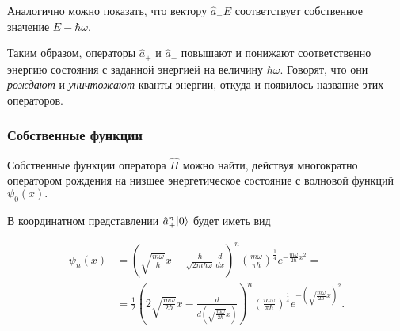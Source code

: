 \documentclass[b5paper]{book}
\DeclarePairedDelimiter\ket{\lvert}{\rangle}
\begin{document}
Аналогично можно показать, что вектору $\hat a_{-} E$ соответствует собственное значение $E - \hbar \omega.$

Таким образом, операторы $\hat a_{+}$ и $\hat a_{-}$ повышают и понижают соответственно
энергию состояния с заданной энергией на величину $\hbar \omega.$ Говорят, что они \textit{рождают}
и \textit{уничтожают} кванты энергии, откуда и появилось название этих операторов.

\subsubsection*{Собственные функции}

Собственные функции оператора $\hat H$ можно найти, действуя многократно оператором рождения на низшее
энергетическое состояние с волновой функций $\psi_0(x).$

В координатном представлении $\hat a_+^n \ket{0}$ будет иметь вид

\begin{equation}
\begin{aligned}
\psi_n(x) &= \left(\sqrt{\frac{m\omega}{\hbar}} x - \frac{\hbar}{\sqrt{2m\hbar\omega}}\frac{d}{dx}\right)^n \left(\frac{m\omega}{\pi\hbar}\right)^{\frac 1 4}
e^{-\frac{m\omega}{2\hbar}x^2} = \\
&= \frac 1 2 \left(2 \sqrt{\frac{m\omega}{2\hbar}} x - \frac{d}{d\left(\sqrt{\frac{m\omega}{2\hbar}}x\right)}\right)^n \left(\frac{m\omega}{\pi\hbar}\right)^{\frac 1 4}
e^{-\left(\sqrt{\frac{m\omega}{2\hbar}} x\right)^2}.
\end{aligned}
\end{equation}
\end{document}
